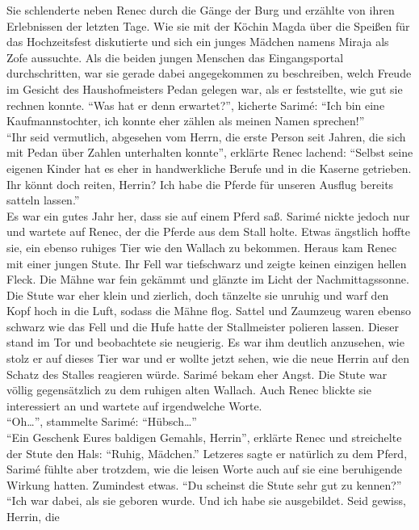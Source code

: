 Sie schlenderte neben Renec durch die Gänge der Burg und erzählte von ihren Erlebnissen der letzten 
Tage. Wie sie mit der Köchin Magda über die Speißen für das Hochzeitsfest diskutierte und sich ein 
junges Mädchen namens Miraja als Zofe aussuchte. Als die beiden jungen Menschen das Eingangsportal 
durchschritten, war sie gerade dabei angegekommen zu beschreiben, welch Freude im Gesicht des 
Haushofmeisters Pedan gelegen war, als er feststellte, wie gut sie rechnen konnte. ``Was hat er 
denn erwartet?'', kicherte Sarimé: ``Ich bin eine Kaufmannstochter, ich konnte eher zählen als 
meinen Namen sprechen!''\\
``Ihr seid vermutlich, abgesehen vom Herrn, die erste Person seit Jahren, die sich mit Pedan über 
Zahlen unterhalten konnte'', erklärte Renec lachend: ``Selbst seine eigenen Kinder hat es eher in 
handwerkliche Berufe und in die Kaserne getrieben. Ihr könnt doch reiten, Herrin? Ich habe die 
Pferde für unseren Ausflug bereits satteln lassen.''\\
Es war ein gutes Jahr her, dass sie auf einem Pferd saß. Sarimé nickte jedoch nur und wartete auf 
Renec, der die Pferde aus dem Stall holte. Etwas ängstlich hoffte sie, ein ebenso ruhiges Tier wie 
den Wallach zu bekommen. Heraus kam Renec mit einer jungen Stute. Ihr Fell war tiefschwarz und 
zeigte keinen einzigen hellen Fleck. Die Mähne war fein gekämmt und glänzte im Licht der 
Nachmittagssonne. Die Stute war eher klein und zierlich, doch tänzelte sie unruhig und 
warf den Kopf hoch in die Luft, sodass die Mähne flog. Sattel und Zaumzeug waren ebenso schwarz wie 
das Fell und die Hufe hatte der Stallmeister polieren lassen. Dieser stand im Tor und beobachtete 
sie neugierig. Es war ihm deutlich anzusehen, wie stolz er auf dieses Tier war und er wollte jetzt 
sehen, wie die neue Herrin auf den Schatz des Stalles reagieren würde. Sarimé bekam eher Angst. Die 
Stute war völlig gegensätzlich zu dem ruhigen alten Wallach. Auch Renec blickte sie interessiert an 
und wartete auf irgendwelche Worte.\\
``Oh…'', stammelte Sarimé: ``Hübsch…''\\
``Ein Geschenk Eures baldigen Gemahls, Herrin'', erklärte Renec und streichelte der Stute den Hals: 
``Ruhig, Mädchen.'' Letzeres sagte er natürlich zu dem Pferd, Sarimé fühlte aber trotzdem, wie die 
leisen Worte auch auf sie eine beruhigende Wirkung hatten. Zumindest etwas. ``Du scheinst die Stute 
sehr gut zu kennen?''\\
``Ich war dabei, als sie geboren wurde. Und ich habe sie ausgebildet. Seid gewiss, Herrin, die 
